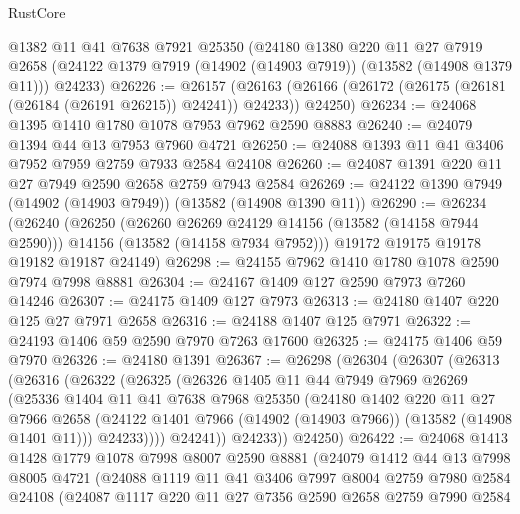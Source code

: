 \begin{lexlean}{RustCore}
\begin{coremodule}
    @1382
    @11
    @41
    @7638
    @7921
    @25350
    (@24180
      @1380
      @220
      @11
      @27
      @7919
      @2658
      (@24122 @1379 @7919 (@14902 (@14903 @7919)) (@13582 (@14908 @1379 @11)))
      @24233)
@26226 := @26157
    (@26163 (@26166 (@26172 (@26175 (@26181 (@26184 (@26191 @26215)) @24241)) @24233)) @24250)
@26234 := @24068 @1395 @1410 @1780 @1078 @7953 @7962 @2590 @8883
@26240 := @24079 @1394 @44 @13 @7953 @7960 @4721
@26250 := @24088 @1393 @11 @41 @3406 @7952 @7959 @2759 @7933 @2584 @24108
@26260 := @24087 @1391 @220 @11 @27 @7949 @2590 @2658 @2759 @7943 @2584
@26269 := @24122 @1390 @7949 (@14902 (@14903 @7949)) (@13582 (@14908 @1390 @11))
@26290 := @26234
    (@26240
      (@26250
        (@26260 @26269 @24129 @14156 (@13582 (@14158 @7944 @2590)))
        @14156
        (@13582 (@14158 @7934 @7952)))
      @19172
      @19175
      @19178
      @19182
      @19187
      @24149)
@26298 := @24155 @7962 @1410 @1780 @1078 @2590 @7974 @7998 @8881
@26304 := @24167 @1409 @127 @2590 @7973 @7260 @14246
@26307 := @24175 @1409 @127 @7973
@26313 := @24180 @1407 @220 @125 @27 @7971 @2658
@26316 := @24188 @1407 @125 @7971
@26322 := @24193 @1406 @59 @2590 @7970 @7263 @17600
@26325 := @24175 @1406 @59 @7970
@26326 := @24180 @1391
@26367 := @26298
    (@26304
      (@26307
        (@26313
          (@26316
            (@26322
              (@26325
                (@26326
                  @1405
                  @11
                  @44
                  @7949
                  @7969
                  @26269
                  (@25336
                    @1404
                    @11
                    @41
                    @7638
                    @7968
                    @25350
                    (@24180
                      @1402
                      @220
                      @11
                      @27
                      @7966
                      @2658
                      (@24122 @1401 @7966 (@14902 (@14903 @7966)) (@13582 (@14908 @1401 @11)))
                      @24233))))
              @24241))
          @24233))
      @24250)
@26422 := @24068
    @1413
    @1428
    @1779
    @1078
    @7998
    @8007
    @2590
    @8881
    (@24079
      @1412
      @44
      @13
      @7998
      @8005
      @4721
      (@24088
        @1119
        @11
        @41
        @3406
        @7997
        @8004
        @2759
        @7980
        @2584
        @24108
        (@24087
          @1117
          @220
          @11
          @27
          @7356
          @2590
          @2658
          @2759
          @7990
          @2584

\end{coremodule}
\end{lexlean}
